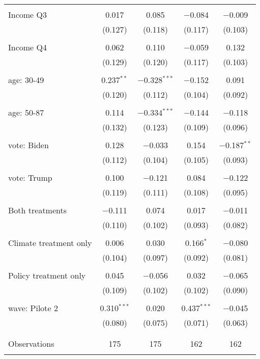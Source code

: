 \begin{tabular}{@{\extracolsep{5pt}}lcccc}
  & & & & \\ 
 Income Q3 & 0.017 & 0.085 & $-$0.084 & $-$0.009 \\ 
  & (0.127) & (0.118) & (0.117) & (0.103) \\ 
  & & & & \\ 
 Income Q4 & 0.062 & 0.110 & $-$0.059 & 0.132 \\ 
  & (0.129) & (0.120) & (0.117) & (0.103) \\ 
  & & & & \\ 
 age: 30-49 & 0.237$^{**}$ & $-$0.328$^{***}$ & $-$0.152 & 0.091 \\ 
  & (0.120) & (0.112) & (0.104) & (0.092) \\ 
  & & & & \\ 
 age: 50-87 & 0.114 & $-$0.334$^{***}$ & $-$0.144 & $-$0.118 \\ 
  & (0.132) & (0.123) & (0.109) & (0.096) \\ 
  & & & & \\ 
 vote: Biden & 0.128 & $-$0.033 & 0.154 & $-$0.187$^{**}$ \\ 
  & (0.112) & (0.104) & (0.105) & (0.093) \\ 
  & & & & \\ 
 vote: Trump & 0.100 & $-$0.121 & 0.084 & $-$0.122 \\ 
  & (0.119) & (0.111) & (0.108) & (0.095) \\ 
  & & & & \\ 
 Both treatments & $-$0.111 & 0.074 & 0.017 & $-$0.011 \\ 
  & (0.110) & (0.102) & (0.093) & (0.082) \\ 
  & & & & \\ 
 Climate treatment only & 0.006 & 0.030 & 0.166$^{*}$ & $-$0.080 \\ 
  & (0.104) & (0.097) & (0.092) & (0.081) \\ 
  & & & & \\ 
 Policy treatment only & 0.045 & $-$0.056 & 0.032 & $-$0.065 \\ 
  & (0.109) & (0.102) & (0.102) & (0.090) \\ 
  & & & & \\ 
 wave: Pilote 2 & 0.310$^{***}$ & 0.020 & 0.437$^{***}$ & $-$0.045 \\ 
  & (0.080) & (0.075) & (0.071) & (0.063) \\ 
  & & & & \\ 
\hline \\[-1.8ex] 

Observations & 175 & 175 & 162 & 162 \\ 
\hline 
\hline \\[-1.8ex] 
\end{tabular} 